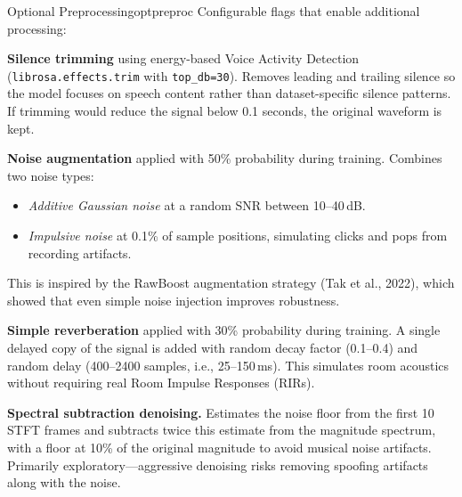 \documentclass[12pt]{report}
\begin{document}
\begin{tecbox}{Optional Preprocessing}{optpreproc}
    Configurable flags that enable additional processing:
    \begin{description}[noitemsep]
        \item[\texttt{USE\_VAD}] \textbf{Silence trimming} using energy-based Voice Activity
              Detection (\texttt{librosa.effects.trim} with \texttt{top\_db=30}).
              Removes leading and trailing silence so the model focuses on speech content
              rather than dataset-specific silence patterns. If trimming would reduce the
              signal below 0.1 seconds, the original waveform is kept.

        \item[\texttt{USE\_RAWBOOST}] \textbf{Noise augmentation} applied with 50\% probability
              during training. Combines two noise types:
              \begin{itemize}[noitemsep]
                  \item \emph{Additive Gaussian noise} at a random SNR between 10--40\,dB.
                  \item \emph{Impulsive noise} at 0.1\% of sample positions, simulating
                        clicks and pops from recording artifacts.
              \end{itemize}
              This is inspired by the RawBoost augmentation strategy (Tak et al., 2022),
              which showed that even simple noise injection improves robustness.

        \item[\texttt{USE\_REVERB}] \textbf{Simple reverberation} applied with 30\% probability
              during training. A single delayed copy of the signal is added with random
              decay factor (0.1--0.4) and random delay (400--2400 samples, i.e., 25--150\,ms).
              This simulates room acoustics without requiring real Room Impulse Responses (RIRs).

        \item[\texttt{USE\_DENOISING}] \textbf{Spectral subtraction denoising.} Estimates the
              noise floor from the first 10 STFT frames and subtracts twice this estimate from
              the magnitude spectrum, with a floor at 10\% of the original magnitude to avoid
              musical noise artifacts. Primarily exploratory---aggressive denoising risks
              removing spoofing artifacts along with the noise.
    \end{description}
\end{tecbox}
\end{document}
